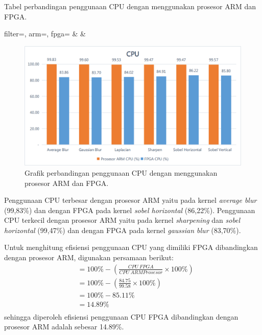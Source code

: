\begin{atable}
    \caption{Tabel perbandingan penggunaan CPU dengan menggunakan prosesor ARM dan FPGA.}
    \label{table:hasil-cpu}
        {
            filter=\filter, 
            arm=\arm, 
            fpga=\fpga}
        {
            \filter & 
            \arm & 
            \fpga }
\end{atable}
\begin{figure}[H]
    \includegraphics[width=0.81\linewidth, center]{images/chart/chart-cpu.png}
    \caption{Grafik perbandingan penggunaan CPU dengan menggunakan prosesor ARM dan FPGA.}
    \label{fig:chart-cpu}
\end{figure}


Penggunaan CPU terbesar dengan prosesor ARM yaitu pada kernel \textit{average blur} (99,83\%) dan dengan FPGA pada kernel \textit{sobel horizontal} (86,22\%). Penggunaan CPU terkecil dengan prosesor ARM yaitu pada kernel \textit{sharpening} dan \textit{sobel horizontal} (99,47\%) dan dengan FPGA pada kernel \textit{gaussian blur} (83,70\%).

Untuk menghitung efisiensi penggunaan CPU yang dimiliki FPGA dibandingkan dengan prosesor ARM, digunakan persamaan berikut:
\begin{equation*}
    \begin{split}
& = 100\% - \left( \frac{CPU\ FPGA}{CPU\ ARM Prosesor} \times 100\% \right) \\
& = 100\% - \left( \frac{84.75}{99.58} \times 100\% \right) \\
& = 100\% - 85.11\% \\
& = 14.89\% \\
    \end{split}
\end{equation*}
sehingga diperoleh efisiensi penggunaan CPU FPGA dibandingkan dengan prosesor ARM adalah sebesar 14.89\%.

